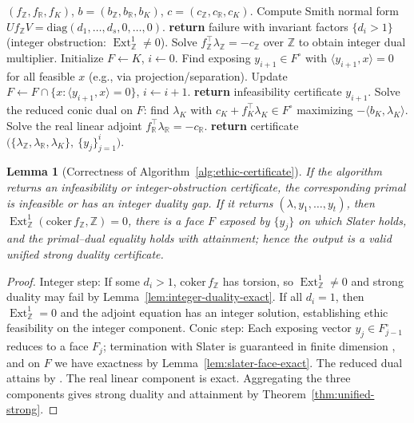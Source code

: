 \documentclass[12pt]{article}
\newcommand{\Ext}{\operatorname{Ext}}
\theoremstyle{plain}
\newtheorem{lemma}[theorem]{Lemma}
\theoremstyle{definition}
\theoremstyle{remark}
\numberwithin{equation}{section}
\begin{document}
\begin{algorithm}
\caption{Unified ethic certificate construction (MILP/LP/SDP)}
\label{alg:ethic-certificate}
\begin{algorithmic}[1]
\REQUIRE $(f_{\mathbb Z},f_{\mathbb R},f_K)$, $b=(b_{\mathbb Z},b_{\mathbb R},b_K)$, $c=(c_{\mathbb Z},c_{\mathbb R},c_K)$.
\STATE Compute Smith normal form $U f_{\mathbb Z} V=\mathrm{diag}(d_1,\dots,d_s,0,\dots,0)$.
  \STATE \textbf{return} failure with invariant factors $\{d_i>1\}$ (integer obstruction: $\Ext^1_{\mathbb Z}\neq 0$).
\ELSE
  \STATE Solve $f_{\mathbb Z}^\top \lambda_{\mathbb Z}=-c_{\mathbb Z}$ over $\mathbb Z$ to obtain integer dual multiplier.
\ENDIF
\STATE Initialize $F\leftarrow K$, $i\leftarrow 0$.
  \STATE Find exposing $y_{i+1}\in F^\circ$ with $\langle y_{i+1},x\rangle=0$ for all feasible $x$ (e.g., via projection/separation).
  \STATE Update $F\leftarrow F\cap \{x:\langle y_{i+1},x\rangle=0\}$, $i\leftarrow i+1$.
    \STATE \textbf{return} infeasibility certificate $y_{i+1}$.
  \ENDIF
\ENDWHILE
\STATE Solve the reduced conic dual on $F$: find $\lambda_K$ with $c_K+ f_K^\top\lambda_K\in F^\circ$ maximizing $-\langle b_K,\lambda_K\rangle$.
\STATE Solve the real linear adjoint $f_{\mathbb R}^\top\lambda_{\mathbb R}=-c_{\mathbb R}$.
\STATE \textbf{return} certificate $\big(\{\lambda_{\mathbb Z},\lambda_{\mathbb R},\lambda_K\},\ \{y_j\}_{j=1}^i\big)$.
\end{algorithmic}
\end{algorithm}

\begin{lemma}[Correctness of Algorithm~\ref{alg:ethic-certificate}]\label{lem:alg-correct}
If the algorithm returns an infeasibility or integer-obstruction certificate, the corresponding primal is infeasible or has an integer duality gap. If it returns $(\lambda,y_1,\dots,y_t)$, then $\Ext^1_{\mathbb Z}(\mathrm{coker}\,f_{\mathbb Z},\mathbb Z)=0$, there is a face $F$ exposed by $\{y_j\}$ on which Slater holds, and the primal–dual equality holds with attainment; hence the output is a valid unified strong duality certificate.
\end{lemma}

\begin{proof}
Integer step: If some $d_i>1$, $\mathrm{coker}\,f_{\mathbb Z}$ has torsion, so $\Ext^1_{\mathbb Z}\neq 0$ and strong duality may fail by Lemma~\ref{lem:integer-duality-exact}. If all $d_i=1$, then $\Ext^1_{\mathbb Z}=0$ and the adjoint equation has an integer solution, establishing ethic feasibility on the integer component. Conic step: Each exposing vector $y_j\in F_{j-1}^\circ$ reduces to a face $F_j$; termination with Slater is guaranteed in finite dimension \cite{BorweinWolkowicz1981}, and on $F$ we have exactness by Lemma~\ref{lem:slater-face-exact}. The reduced dual attains by \cite{Rockafellar1970}. The real linear component is exact. Aggregating the three components gives strong duality and attainment by Theorem~\ref{thm:unified-strong}.
\end{proof}
\end{document}
